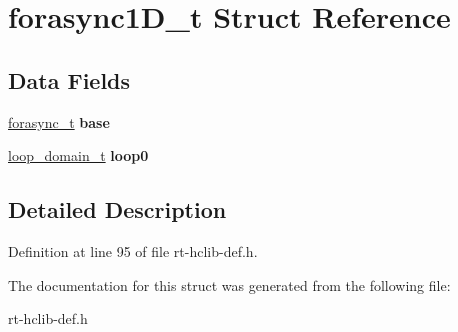 \hypertarget{structforasync1D__t}{\section{forasync1\-D\-\_\-t Struct Reference}
\label{structforasync1D__t}
}
\subsection*{Data Fields}
\begin{DoxyCompactItemize}
\item 
\hypertarget{structforasync1D__t_af920d6b271eba5bb9b7c7becf18742a9}{\hyperlink{structforasync__t}{forasync\-\_\-t} {\bfseries base}}\label{structforasync1D__t_af920d6b271eba5bb9b7c7becf18742a9}

\item 
\hypertarget{structforasync1D__t_a6a1e3026b2eab15cc163463877e4699c}{\hyperlink{structloop__domain__t}{loop\-\_\-domain\-\_\-t} {\bfseries loop0}}\label{structforasync1D__t_a6a1e3026b2eab15cc163463877e4699c}

\end{DoxyCompactItemize}


\subsection{Detailed Description}


Definition at line 95 of file rt-\/hclib-\/def.\-h.



The documentation for this struct was generated from the following file\-:\begin{DoxyCompactItemize}
\item 
rt-\/hclib-\/def.\-h\end{DoxyCompactItemize}
